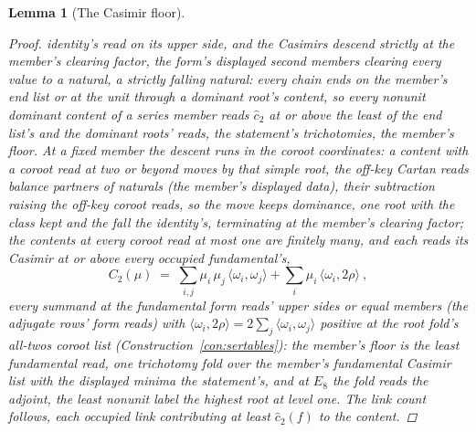 \documentclass[11pt]{article}
\newtheorem{lemma}{Lemma}
\theoremstyle{definition}
\begin{document}
\begin{lemma}[The Casimir floor]
\begin{proof}
identity's read on its upper side, and the Casimirs descend
strictly at the member's clearing factor, the form's displayed
second members clearing every value to a natural, a
strictly falling natural: every
chain ends on the member's end list or at the unit through a
dominant root's content, so every nonunit dominant content of a
series member reads $\hat c_2$ at or above the least of the end
list's and the dominant roots' reads, the statement's
trichotomies, the member's floor. At a fixed member the descent
runs in the coroot coordinates: a content with a coroot read at
two or beyond moves by that simple root, the off-key Cartan reads
balance partners of naturals (the member's displayed data), their
subtraction raising the off-key coroot reads, so the move keeps
dominance, one root with the class kept and the fall the
identity's, terminating at the member's clearing factor; the
contents at every coroot read at most one are finitely many, and
each reads its Casimir at or above every occupied fundamental's,
\[
C_2(\mu)\;=\;\sum_{i,j}\mu_i\,\mu_j\,\langle\omega_i,\omega_j\rangle
+\sum_i\mu_i\,\langle\omega_i,2\rho\rangle\ ,
\]
every summand at the fundamental form reads' upper sides or equal
members (the adjugate rows' form reads) with
$\langle\omega_i,2\rho\rangle=2\sum_j\langle\omega_i,\omega_j\rangle$
positive at the root fold's all-twos coroot list
(Construction~\ref{con:sertables}): the member's floor is the
least fundamental read, one trichotomy fold over the member's
fundamental Casimir list with the displayed minima the
statement's, and at $E_8$ the fold reads the adjoint, the least
nonunit label the highest root at level one. The link count follows, each occupied link
contributing at least $\hat c_2(f)$ to the content.
\end{proof}
\end{lemma}
\end{document}
